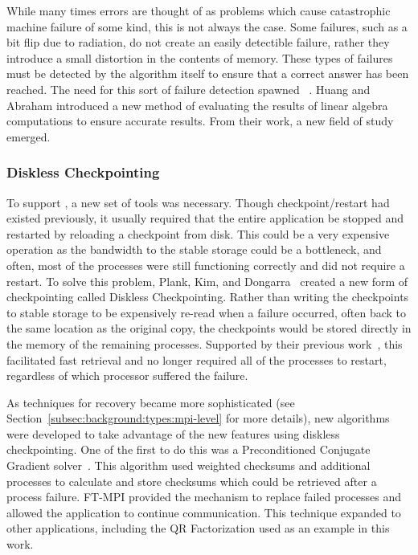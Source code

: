 While many times errors are thought of as problems which cause catastrophic machine 
failure of some kind, this is not always the case. Some failures, such as a bit 
flip due to radiation, do not create an easily detectible failure, rather they 
introduce a small distortion in the contents of memory. These types of failures 
must be detected by the algorithm itself to ensure that a correct answer has 
been reached. The need for this sort of failure detection spawned \abft~\cite{Huang:1984kt}. 
Huang and Abraham introduced a new method of evaluating the results of linear 
algebra computations to ensure accurate results. From their work, a new field of 
study emerged.

\subsubsection{Diskless Checkpointing}

To support \abft, a new set of tools was necessary. Though checkpoint/restart 
had existed previously, it usually required that the entire application be 
stopped and restarted by reloading a checkpoint from disk. This could be a very 
expensive operation as the bandwidth to the stable storage could be a 
bottleneck, and often, most of the processes were still functioning correctly 
and did not require a restart. To solve this problem, Plank, Kim, and Dongarra~
\cite{Plank:1995hv} created a new form of checkpointing called Diskless 
Checkpointing. Rather than writing the checkpoints to stable storage to be expensively 
re-read when a failure occurred, often back to the same location as the original copy, 
the checkpoints would be stored directly in the memory of 
the remaining processes. Supported by their previous work~\cite{Plank:1995wz}, 
this facilitated fast retrieval and no longer required all of the processes 
to restart, regardless of which processor suffered the failure.

As \mpi techniques for recovery became more sophisticated (see 
Section~\ref{subsec:background:types:mpi-level} for more details), new algorithms were 
developed to take advantage of the new features using diskless checkpointing. One of 
the first to do this was a Preconditioned Conjugate Gradient solver~\cite{Chen:2005ux}. 
This algorithm used weighted checksums and additional \mpi processes to calculate and 
store checksums which could be retrieved after a process failure. FT-MPI provided the 
mechanism to replace failed processes and allowed the application to continue 
communication. This technique expanded to other applications, including the QR 
Factorization used as an example in this work.

